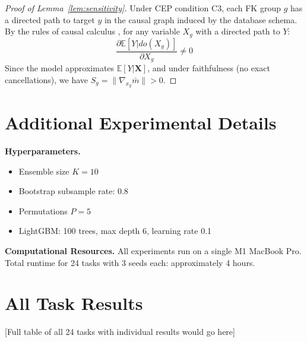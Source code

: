 \documentclass{article}
\begin{document}
\begin{proof}[Proof of Lemma~\ref{lem:sensitivity}]
Under CEP condition C3, each FK group $g$ has a directed path to target $y$ in the
causal graph induced by the database schema. By the rules of causal calculus
\citep{pearl2009causality}, for any variable $X_g$ with a directed path to $Y$:
\begin{equation}
\frac{\partial \mathbb{E}[Y|do(X_g)]}{\partial X_g} \neq 0
\end{equation}
Since the model approximates $\mathbb{E}[Y|\mathbf{X}]$, and under faithfulness
(no exact cancellations), we have $S_g = \|\nabla_{x_g} \bar{m}\| > 0$.
\end{proof}

\section{Additional Experimental Details}
\label{app:experiments}

\textbf{Hyperparameters.}
\begin{itemize}
    \item Ensemble size $K = 10$
    \item Bootstrap subsample rate: 0.8
    \item Permutations $P = 5$
    \item LightGBM: 100 trees, max depth 6, learning rate 0.1
\end{itemize}

\textbf{Computational Resources.}
All experiments run on a single M1 MacBook Pro. Total runtime for 24 tasks with
3 seeds each: approximately 4 hours.

\section{All Task Results}
\label{app:all_results}

[Full table of all 24 tasks with individual results would go here]
\end{document}
